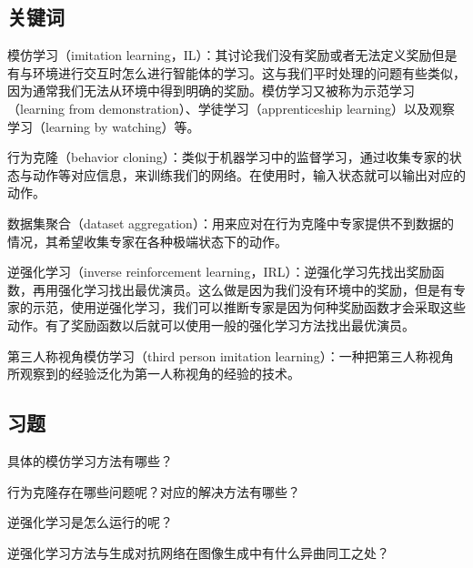 \subsection{关键词}

模仿学习（imitation learning，IL）：其讨论我们没有奖励或者无法定义奖励但是有与环境进行交互时怎么进行智能体的学习。这与我们平时处理的问题有些类似，因为通常我们无法从环境中得到明确的奖励。模仿学习又被称为示范学习（learning from demonstration）、学徒学习（apprenticeship learning）以及观察学习（learning by watching）等。

行为克隆（behavior cloning）：类似于机器学习中的监督学习，通过收集专家的状态与动作等对应信息，来训练我们的网络。在使用时，输入状态就可以输出对应的动作。

数据集聚合（dataset aggregation）：用来应对在行为克隆中专家提供不到数据的情况，其希望收集专家在各种极端状态下的动作。

逆强化学习（inverse reinforcement learning，IRL）：逆强化学习先找出奖励函数，再用强化学习找出最优演员。这么做是因为我们没有环境中的奖励，但是有专家的示范，使用逆强化学习，我们可以推断专家是因为何种奖励函数才会采取这些动作。有了奖励函数以后就可以使用一般的强化学习方法找出最优演员。

第三人称视角模仿学习（third person imitation learning）：一种把第三人称视角所观察到的经验泛化为第一人称视角的经验的技术。


\subsection{习题}

 具体的模仿学习方法有哪些？

 行为克隆存在哪些问题呢？对应的解决方法有哪些？

 逆强化学习是怎么运行的呢？

 逆强化学习方法与生成对抗网络在图像生成中有什么异曲同工之处？

